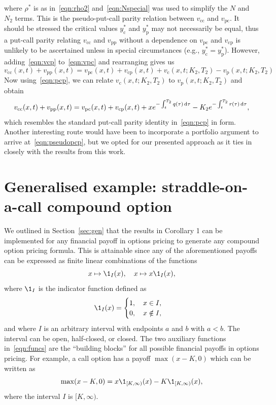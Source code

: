where $\rho^*$ is as in~\eqref{eqn:rho2} and~\eqref{eqn:Nspecial} was used to simplify the $N$ and $N_2$ terms. This is the pseudo-put-call parity relation between $v_\text{cc}$ and $v_\text{pc}$. It should be stressed the critical values $y_\text{c}^*$ and $y_\text{p}^*$ may not necessarily be equal, thus a put-call parity relating $v_\text{cc}$ and $v_\text{pp}$ without a dependence on $v_\text{pc}$ and $v_\text{cp}$ is unlikely to be ascertained unless in special circumstances (e.g., $y_\text{c}^* = y_\text{p}^*$). However, adding~\eqref{eqn:vcp} to~\eqref{eqn:vpc} and rearranging gives us
	\begin{equation*}
		v_\text{cc}(x,t) + v_\text{pp}(x,t) = v_\text{pc}(x,t) + v_\text{cp}(x,t) + v_\text{c}(x,t; K_2, T_2) - v_\text{p}(x,t; K_2, T_2)
	\end{equation*}
Now using~\eqref{eqn:pcp}, we can relate $v_\text{c}(x,t; K_2, T_2)$ to $v_\text{p}(x,t; K_2, T_2)$ and obtain
	\begin{equation}
		\label{eqn:pseudopcp}
		v_\text{cc}(x,t) + v_\text{pp}(x,t) =  v_\text{pc}(x,t) + v_\text{cp}(x,t) + xe^{-\int_t^{T_2} q(\tau) \, \mathrm d\tau} - K_2e^{-\int_t^{T_2} r(\tau) \, \mathrm d\tau},
	\end{equation}
which resembles the standard put-call parity identity in~\eqref{eqn:pcp} in form. Another interesting route would have been to incorporate a portfolio argument to arrive at~\eqref{eqn:pseudopcp}, but we opted for our presented approach as it ties in closely with the results from this work.

\section{Generalised example: straddle-on-a-call compound option}
We outlined in Section~\ref{sec:gen} that the results in Corollary 1 can be implemented for any financial payoff in options pricing to generate any compound option pricing formula. This is attainable since any of the aforementioned payoffs can be expressed as finite linear combinations of the functions
	\begin{equation}
		\label{eqn:funcs}
		x \mapsto \1_I(x), \quad x \mapsto x\1_I(x),
	\end{equation}
where $\1_I$ is the indicator function defined as
	\begin{equation*}
		\1_I(x) = \begin{cases}
			1, \quad x \in I, \\
			0, \quad x \notin I,
		\end{cases}
	\end{equation*}
and where $I$ is an arbitrary interval with endpoints $a$ and $b$ with $a < b$. The interval can be open, half-closed, or closed. The two auxiliary functions in~\eqref{eqn:funcs} are the ``building blocks'' for all possible financial payoffs in options pricing. For example, a call option has a payoff $\max(x-K,0)$ which can be written as
	\begin{equation*}
		\max(x-K,0) = x\1_{[K,\infty)}(x) - K\1_{[K,\infty)}(x),
	\end{equation*}
where the interval $I$ is $[K,\infty)$.

